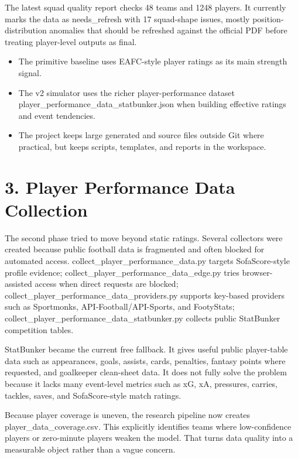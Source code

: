 \documentclass[10pt]{article}
\begin{document}
The latest squad quality report checks 48 teams and 1248 players. It currently marks the data as needs\_refresh with 17 squad-shape issues, mostly position-distribution anomalies that should be refreshed against the official PDF before treating player-level outputs as final.

\begin{itemize}
  \item The primitive baseline uses EAFC-style player ratings as its main strength signal.
  \item The v2 simulator uses the richer player-performance dataset player\_performance\_data\_statbunker.json when building effective ratings and event tendencies.
  \item The project keeps large generated and source files outside Git where practical, but keeps scripts, templates, and reports in the workspace.
\end{itemize}

\section{3. Player Performance Data Collection}

The second phase tried to move beyond static ratings. Several collectors were created because public football data is fragmented and often blocked for automated access. collect\_player\_performance\_data.py targets SofaScore-style profile evidence; collect\_player\_performance\_data\_edge.py tries browser-assisted access when direct requests are blocked; collect\_player\_performance\_data\_providers.py supports key-based providers such as Sportmonks, API-Football/API-Sports, and FootyStats; collect\_player\_performance\_data\_statbunker.py collects public StatBunker competition tables.

StatBunker became the current free fallback. It gives useful public player-table data such as appearances, goals, assists, cards, penalties, fantasy points where requested, and goalkeeper clean-sheet data. It does not fully solve the problem because it lacks many event-level metrics such as xG, xA, pressures, carries, tackles, saves, and SofaScore-style match ratings.

Because player coverage is uneven, the research pipeline now creates player\_data\_coverage.csv. This explicitly identifies teams where low-confidence players or zero-minute players weaken the model. That turns data quality into a measurable object rather than a vague concern.
\end{document}
